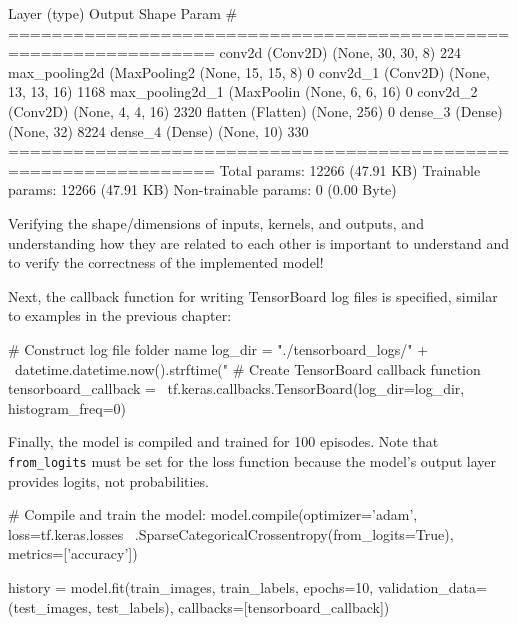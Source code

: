 \begin{textcode}
 Layer (type)                Output Shape              Param #   
=================================================================
 conv2d (Conv2D)             (None, 30, 30, 8)         224       
 max_pooling2d (MaxPooling2  (None, 15, 15, 8)         0         
 conv2d_1 (Conv2D)           (None, 13, 13, 16)        1168      
 max_pooling2d_1 (MaxPoolin  (None, 6, 6, 16)          0         
 conv2d_2 (Conv2D)           (None, 4, 4, 16)          2320      
 flatten (Flatten)           (None, 256)               0         
 dense_3 (Dense)             (None, 32)                8224      
 dense_4 (Dense)             (None, 10)                330       
=================================================================
Total params: 12266 (47.91 KB)
Trainable params: 12266 (47.91 KB)
Non-trainable params: 0 (0.00 Byte)
\end{textcode}

\begin{alertbox}
Verifying the shape/dimensions of inputs, kernels, and outputs, and understanding how they are related to each other is important to understand and to verify the correctness of the implemented model!
\end{alertbox}

Next, the callback function for writing TensorBoard log files is specified, similar to examples in the previous chapter:

\begin{pythoncode}
# Construct log file folder name
log_dir = "./tensorboard_logs/" + \
    datetime.datetime.now().strftime("%
# Create TensorBoard callback function
tensorboard_callback = \
    tf.keras.callbacks.TensorBoard(log_dir=log_dir, histogram_freq=0)
\end{pythoncode}

Finally, the model is compiled and trained for 100 episodes. Note that \texttt{from\_logits} must be set for the loss function because the model's output layer provides logits, not probabilities.

\begin{pythoncode}
# Compile and train the model:
model.compile(optimizer='adam',
    loss=tf.keras.losses \
        .SparseCategoricalCrossentropy(from_logits=True),
    metrics=['accuracy'])

history = model.fit(train_images, train_labels, 
    epochs=10, 
    validation_data=(test_images, test_labels),
    callbacks=[tensorboard_callback])
\end{pythoncode}


